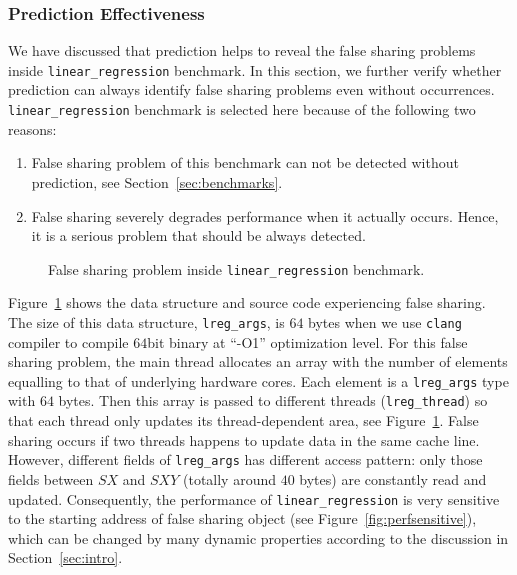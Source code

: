 \subsubsection{Prediction Effectiveness}
\label{sec:predicteval}
We have discussed that prediction helps to reveal the false sharing problems inside \texttt{linear\_regression} benchmark. In this section, we further verify whether prediction can always identify 
false sharing problems even without occurrences.
\texttt{linear\_regression} benchmark is selected here because of the following two reasons:
\begin{enumerate}
\item
False sharing problem of this benchmark can not be detected without prediction, see Section~\ref{sec:benchmarks}. 

\item
False sharing severely degrades performance when it actually occurs. 
Hence, it is a serious problem that should be always detected. 
\end{enumerate}

\begin{figure}[!h]
{\centering
\subfigure{}
\caption{False sharing problem inside \texttt{linear\_regression} benchmark.
\label{fig:linearregression}}
}
\end{figure}

Figure~\ref{fig:linearregression} shows the data structure and source code
experiencing false sharing.
The size of this data structure, \texttt{lreg\_args}, is $64$ bytes 
when we use \texttt{clang} compiler to compile $64$bit binary at ``-O1'' optimization level.
For this false sharing problem, the main thread allocates an array with the number of elements equalling
to that of underlying hardware cores.
Each element is a \texttt{lreg\_args} type with $64$ bytes. 
Then this array is passed to different threads (\texttt{lreg\_thread}) 
so that each thread only updates its thread-dependent area, see Figure~\ref{fig:linearregression}.
False sharing occurs if two threads happens to update data in the same cache line. 
However, different fields of \texttt{lreg\_args} has different access pattern:
only those fields between $SX$ and $SXY$ (totally around $40$ bytes) are constantly read and updated.
Consequently, the performance of \texttt{linear\_regression} is very sensitive to 
the starting address of false sharing object (see Figure~\ref{fig:perfsensitive}),
which can be changed by many dynamic properties according
to the discussion in Section~\ref{sec:intro}.

